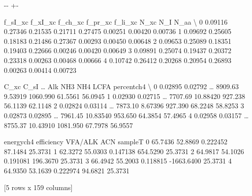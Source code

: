 \documentclass[a4paper,10pt,english]{sphinxmanual}
\newlength\nbsphinxcodecellspacing
\begin{document}
{

\kern-\sphinxverbatimsmallskipamount\kern-\baselineskip
\kern+\FrameHeightAdjust\kern-\fboxrule
\vspace{\nbsphinxcodecellspacing}

\begin{sphinxVerbatim}[commandchars=\\\{\}]
\llap{\color{nbsphinxout}[22]:\,\hspace{\fboxrule}\hspace{\fboxsep}}   f\_sI\_xc  f\_xI\_xc  f\_ch\_xc  f\_pr\_xc  f\_li\_xc     N\_xc      N\_I     N\_aa  \textbackslash{}
0  0.09116  0.27346  0.21535  0.21711  0.27475  0.00251  0.00420  0.00736
1  0.09692  0.25605  0.18183  0.21486  0.27367  0.00293  0.00450  0.00648
2  0.09653  0.25089  0.18351  0.19403  0.22666  0.00246  0.00420  0.00649
3  0.09891  0.25074  0.19437  0.20372  0.23318  0.00263  0.00468  0.00666
4  0.10742  0.26412  0.20268  0.20954  0.26893  0.00263  0.00414  0.00723

      C\_xc     C\_sI  {\ldots}     Alk       NH3       NH4     LCFA    percentch4   \textbackslash{}
0  0.02895  0.02792  {\ldots}  8909.63   9.53919  1060.990  61.5561       56.0945
1  0.02930  0.02715  {\ldots}  7707.69  10.88420   927.238  56.1139       62.1148
2  0.02824  0.03114  {\ldots}  7873.10   8.67396   927.390  68.2248       58.8253
3  0.02873  0.02895  {\ldots}  7961.45  10.83540   953.650  64.3854       57.4965
4  0.02958  0.03157  {\ldots}  8755.37  10.43910  1081.950  67.7978       56.9557

    energych4   efficiency   VFA/ALK        ACN  sampleT
0      65.7436     52.8869  0.222452    87.1484  25.3731
1      62.3272     55.0303  0.147138   654.5290  25.3731
2      64.9817     54.1026  0.191081   196.3670  25.3731
3      66.4942     55.2003  0.118815 -1663.6400  25.3731
4      64.9350     53.1639  0.222974    94.6821  25.3731

[5 rows x 159 columns]
\end{sphinxVerbatim}
}
\end{document}
